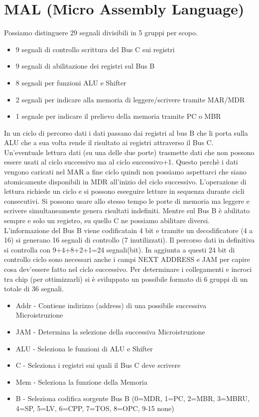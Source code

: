 \section{MAL (Micro Assembly Language)}
Possiamo distinguere 29 segnali divisibili in 5 gruppi per scopo.
\begin{itemize}
\item 9 segnali di controllo scrittura del Bus C sui registri
\item 9 segnali di abilitazione dei registri sul Bus B
\item 8 segnali per funzioni ALU e Shifter
\item 2 segnali per indicare alla memoria di leggere/scrivere tramite MAR/MDR
\item 1 segnale per indicare il prelievo della memoria tramite PC o MBR
\end{itemize}
In un ciclo di percorso dati i dati passano dai registri al bus B che li porta sulla ALU che a sua volta rende il risultato ai registri attraverso il Bus C. Un'eventuale lettura dati (su una delle due porte) trasmette dati che non possono essere usati al ciclo successivo ma al ciclo successivo+1. Questo perchè i dati vengono caricati nel MAR a fine ciclo quindi non possiamo aspettarci che siano atomicamente disponibili in MDR all'inizio del ciclo successivo. L'operazione di lettura richiede un ciclo e si possono eseeguire letture in sequenza durante cicli consecutivi. Si possono usare allo stesso tempo le porte di memoria ma leggere e scrivere simultaneamente genera risultati indefiniti. Mentre sul Bus B è abilitato sempre e solo un registro, su quello C ne possiamo abilitare diversi. L'informazione del Bus B viene codificatain 4 bit e tramite un decodificatore (4 a 16) si generano 16 segnali di controllo (7 inutilizzati).
Il percorso dati in definitiva si controlla con 9+4+8+2+1=24 segnali(bit). In aggiunta a questi 24 bit di controllo ciclo sono necessari anche i campi NEXT ADDRESS e JAM per capire cosa dev'essere fatto nel ciclo successivo. Per determinare i collegamenti e incroci tra chip (per ottimizzarli) si è sviluppato un possibile formato di 6 gruppi di un totale di 36 segnali.
\begin{itemize}
\item Addr - Contiene indirizzo (address) di una possibile successiva Microistruzione
\item JAM - Determina la selezione della successiva Microistruzione
\item ALU - Seleziona le funzioni di ALU e Shifter
\item C - Seleziona i registri sui quali il Bus C deve scrivere
\item Mem - Seleziona la funzione della Memoria
\item B - Seleziona codifica sorgente Bus B (0=MDR, 1=PC, 2=MBR, 3=MBRU, 4=SP, 5=LV, 6=CPP, 7=TOS, 8=OPC, 9-15 none)
\end{itemize}
